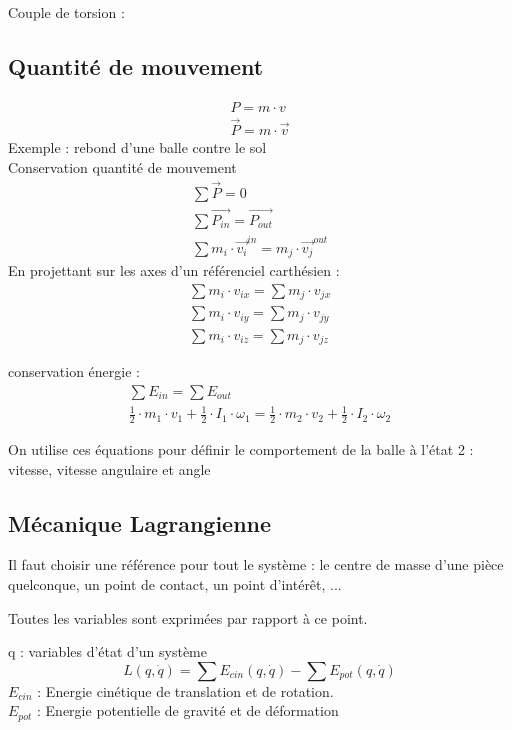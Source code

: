 Couple de torsion :

\subsection{Quantité de mouvement}

\begin{eqnarray}
P=m\cdot v\\
\vec{P}= m \cdot \vec{v}
\end{eqnarray}
Exemple : rebond d'une balle contre le sol \\

Conservation quantité de mouvement 
\begin{eqnarray}
\sum \vec{P}=0\\
\sum \vec{P_{in}}=\vec{P_{out}} \\
\sum m_i \cdot \vec{v_i}^{in}=m_j \cdot \vec{v_j}^{out}
\end{eqnarray}
En projettant sur les axes d'un référenciel carthésien : 
\begin{eqnarray}
\sum m_i \cdot v_{ix}=\sum m_j \cdot v_{jx}\\
\sum m_i \cdot v_{iy}=\sum m_j \cdot v_{jy}\\
\sum m_i \cdot v_{iz}=\sum m_j \cdot v_{jz}
\end{eqnarray}

conservation énergie :
\begin{eqnarray}
\sum E_{in}=\sum E_{out}\\
\frac{1}{2} \cdot m_1 \cdot v_1 + \frac{1}{2} \cdot I_1 \cdot \omega_1=
\frac{1}{2} \cdot m_2 \cdot v_2 +\frac{1}{2} \cdot I_2 \cdot \omega_2
\end{eqnarray}

On utilise ces équations pour définir le comportement de la balle à l'état 2 : vitesse, vitesse angulaire et angle
\subsection{Mécanique Lagrangienne}

Il faut choisir une référence pour tout le système : le centre de masse d'une pièce quelconque, un point de contact, un point d'intérêt, ...

Toutes les variables sont exprimées par rapport à ce point. 

q : variables d'état d'un système
\begin{equation}
L(q,\dot{q})=\sum E_{cin}(q,\dot{q}) - \sum E_{pot}(q,\dot{q})
\end{equation}
$E_{cin}$ : Energie cinétique de translation et de rotation.\\
$E_{pot}$ : Energie potentielle de gravité et de déformation

